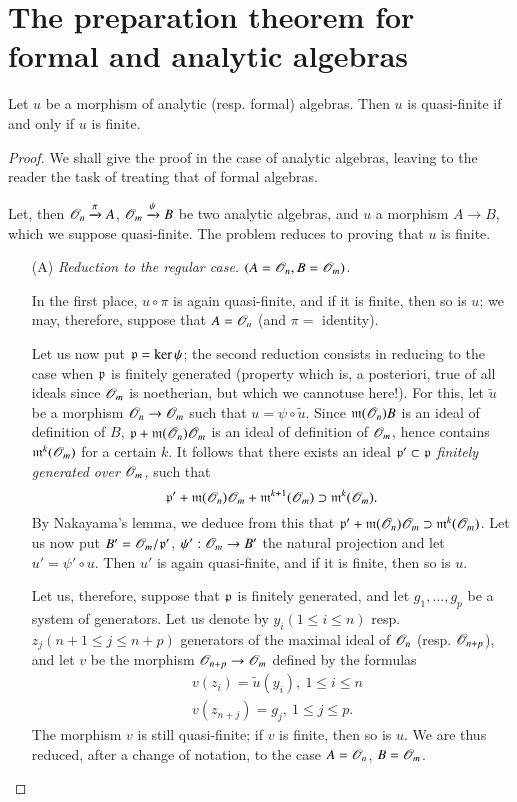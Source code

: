 \section{The preparation theorem for formal and analytic algebras}\label{chap3-sec3}

\begin{theorem}\label{chap3-thm3.1}
Let $u$ be a morphism of analytic (resp. formal) algebras. Then $u$ is quasi-finite if and only if $u$ is finite.
\end{theorem}

\begin{proof}
We shall give the proof in the case of analytic algebras, leaving to the reader the task of treating that of formal algebras.

Let, then $\mathscr{O}_{n}\xrightarrow{\pi}A$, $\mathscr{O}_{m}\xrightarrow{\psi}B$ be two analytic algebras, and $u$ a morphism $A\to B$, which we suppose quasi-finite. The problem reduces to proving that $u$ is finite.
\begin{itemize}
\item[(A)] {\em Reduction to the regular case. $(A=\mathscr{O}_{n},B=\mathscr{O}_{m})$.}

In the first place, $u\circ \pi$ is again quasi-finite, and if it is finite, then so is $u$; we may, therefore, suppose that $A=\mathscr{O}_{n}$ (and $\pi=$ identity).

Let us now put $\mathfrak{p}=\ker\psi$; the second reduction consists in reducing to the case when $\mathfrak{p}$ is finitely generated (property which is, a posteriori, true of all ideals since $\mathscr{O}_{m}$ is noetherian, but which we cannot\pageoriginale use here!). For this, let $\widetilde{u}$ be a morphism $\mathscr{O}_{n}\to \mathscr{O}_{m}$ such that $u=\psi\circ \widetilde{u}$. Since $\mathfrak{m}(\mathscr{O}_{n})B$ is an ideal of definition of $B$, $\mathfrak{p}+\mathfrak{m}(\mathscr{O}_{n})\mathscr{O}_{m}$ is an ideal of definition of $\mathscr{O}_{m}$, hence contains $\mathfrak{m}^{k}(\mathscr{O}_{m})$ for a certain $k$. It follows that there exists an ideal $\mathfrak{p}'\subset \mathfrak{p}$ {\em finitely generated over $\mathscr{O}_{m}$,} such that
$$
\mathfrak{p}'+\mathfrak{m}(\mathscr{O}_{n})\mathscr{O}_{m}+\mathfrak{m}^{k+1}(\mathscr{O}_{m})\supset \mathfrak{m}^{k}(\mathscr{O}_{m}).
$$
By Nakayama's lemma, we deduce from this that $\mathfrak{p}'+\mathfrak{m}(\mathscr{O}_{n})\mathscr{O}_{m}\supset \mathfrak{m}^{k}(\mathscr{O}_{m})$. Let us now put $B'=\mathscr{O}_{m}/\mathfrak{p}'$, $\psi':\mathscr{O}_{m}\to B'$ the natural projection and let $u'=\psi'\circ u$. Then $u'$ is again quasi-finite, and if it is finite, then so is $u$.

Let us, therefore, suppose that $\mathfrak{p}$ is finitely generated, and let $g_{1},\ldots,g_{p}$ be a system of generators. Let us denote by $y_{i}(1\leq i\leq n)$ resp. $z_{j}(n+1\leq j\leq n+p)$ generators of the maximal ideal of $\mathscr{O}_{n}$ (resp. $\mathscr{O}_{n+p}$), and let $v$ be the morphism $\mathscr{O}_{n+p}\to \mathscr{O}_{m}$ defined by the formulas
\begin{align*}
& v(z_{i})=\widetilde{u}(y_{i}), \ 1\leq i\leq n\\
& v(z_{n+j})=g_{j}, \ 1\leq j\leq p.
\end{align*}
The morphism $v$ is still quasi-finite; if $v$ is finite, then so is $u$. We are thus reduced, after a change of notation, to the case $A=\mathscr{O}_{n}$, $B=\mathscr{O}_{m}$.


\end{itemize}
\end{proof}
